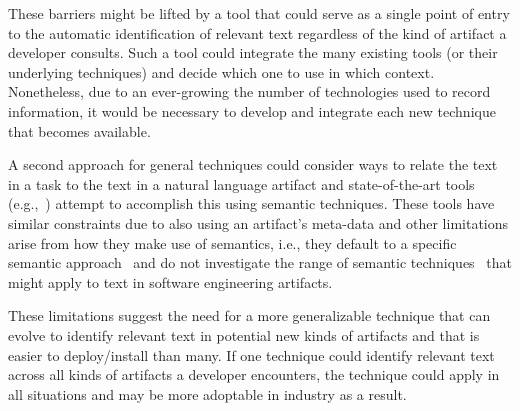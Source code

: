 These barriers might be lifted by a tool that could serve as a single point of entry to the automatic identification of relevant text regardless of the kind of artifact a developer consults.
Such a tool could integrate the many existing tools (or their underlying techniques) and decide which one 
to use in which context. Nonetheless, 
due to an ever-growing the number of technologies used to record information,
it would be necessary to develop and integrate each new technique that  
becomes available. 


A second approach for general techniques could consider ways to relate the text in a task 
to the text in a natural language artifact and  
state-of-the-art tools (e.g.,~\cite{Xu2017, silva2019}) attempt to accomplish this using semantic techniques.
These tools have similar constraints due to also using an artifact's meta-data and other limitations arise from how they make use of semantics,
i.e., they default to a specific semantic approach~\cite{Ye2016} and do not investigate the range of semantic techniques~\cite{Mikolov2013, Devlin2018Bert, fillmore1976frame} 
that might apply to text in software engineering artifacts.






These limitations suggest the need for a more generalizable technique
that can evolve to 
identify relevant text in potential new kinds of artifacts 
and that is easier to deploy/install than many.
If one technique could identify relevant text across all kinds
of artifacts a developer encounters, the technique
could apply in all situations and may be more adoptable in industry
as a result. 










